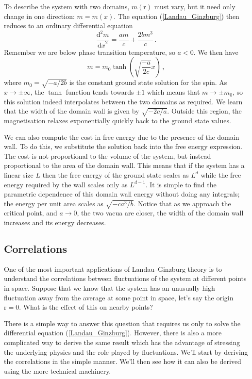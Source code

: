 \documentclass{article}
\theoremstyle{plain}\theoremheaderfont{\normalfont\bfseries}\theorembodyfont{\rmfamily}\theoremseparator{.}\newtheorem*{thm}{Theorem}\newtheorem*{law}{Law}\newtheorem*{pos}{Postulate}
\numberwithin{equation}{section}
\newcommand{\dv}[3][]{\frac{\mathrm{d}^{#1} #2}{{\mathrm{d} #3}^{#1}}}
\newcommand{\vb}[1]{\bm{\mathrm{#1}}}
\begin{document}
    To describe the system with two domains, \(m(\vb{r})\) must vary, but it need only change in one direction: \(m=m(x)\). The equation (\ref{Landau_Ginzburg}) then reduces to an ordinary differential equation
    \begin{equation}
        \dv[2]{m}{x}=\frac{am}{c}+\frac{2bm^3}{c}\,.
    \end{equation}
    Remember we are below phase transition temperature, so \(a<0\). We then have
    \begin{equation}
        m=m_0\tanh\left(\sqrt{\frac{-a}{2c}}x\right)\,,
    \end{equation}
    where \(m_0=\sqrt{-a/2b}\) is the constant ground state solution for the spin. As \(x\to\pm\infty\), the \(\tanh\) function tends towards \(\pm 1\) which means that \(m\to\pm m_0\), so this solution indeed interpolates between the two domains as required. We learn that the width of the domain wall is given by \(\sqrt{-2c/a}\). Outside this region, the magnetisation relaxes exponentially quickly back to the ground state values.

    We can also compute the cost in free energy due to the presence of the domain wall. To do this, we substitute the solution back into the free energy expression. The cost is not proportional to the volume of the system, but instead proportional to the area of the domain wall. This means that if the system has a linear size \(L\) then the free energy of the ground state scales as \(L^d\) while the free energy required by the wall scales only as \(L^{d-1}\). It is simple to find the parametric dependence of this domain wall energy without doing any integrals; the energy per unit area scales as \(\sqrt{-ca^3/b}\). Notice that as we approach the critical point, and \(a\to 0\), the two vacua are closer, the width of the domain wall increases and its energy decreases.

    \subsection{Correlations}
    One of the most important applications of Landau--Ginzburg theory is to understand the correlations between fluctuations of the system at different points in space. Suppose that we know that the system has an unusually high fluctuation away from the average at some point in space, let's say the origin \(\vb{r}=\vb{0}\). What is the effect of this on nearby points?

    There is a simple way to answer this question that requires us only to solve the differential equation (\ref{Landau_Ginzburg}). However, there is also a more complicated way to derive the same result which has the advantage of stressing the underlying physics and the role played by fluctuations. We'll start by deriving the correlations in the simple manner. We'll then see how it can also be derived using the more technical machinery.
\end{document}
